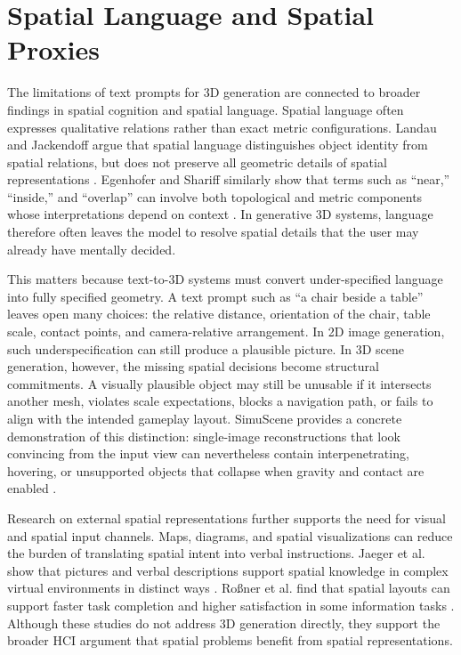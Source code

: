 \documentclass[11pt]{report}
\begin{document}
\section{Spatial Language and Spatial Proxies}
\label{sec:rw-spatial-language}

The limitations of text prompts for 3D generation are connected to broader findings in spatial cognition and spatial language. Spatial language often expresses qualitative relations rather than exact metric configurations. Landau and Jackendoff argue that spatial language distinguishes object identity from spatial relations, but does not preserve all geometric details of spatial representations \cite{landau1993what}. Egenhofer and Shariff similarly show that terms such as ``near,'' ``inside,'' and ``overlap'' can involve both topological and metric components whose interpretations depend on context \cite{egenhofer1998metric}. In generative 3D systems, language therefore often leaves the model to resolve spatial details that the user may already have mentally decided. 

This matters because text-to-3D systems must convert under-specified language into fully specified geometry. A text prompt such as ``a chair beside a table'' leaves open many choices: the relative distance, orientation of the chair, table scale, contact points, and camera-relative arrangement. In 2D image generation, such underspecification can still produce a plausible picture. In 3D scene generation, however, the missing spatial decisions become structural commitments. A visually plausible object may still be unusable if it intersects another mesh, violates scale expectations, blocks a navigation path, or fails to align with the intended gameplay layout. SimuScene provides a concrete demonstration of this distinction: single-image reconstructions that look convincing from the input view can nevertheless contain interpenetrating, hovering, or unsupported objects that collapse when gravity and contact are enabled \cite{lee2026simuscene}.

Research on external spatial representations further supports the need for visual and spatial input channels. Maps, diagrams, and spatial visualizations can reduce the burden of translating spatial intent into verbal instructions. Jaeger et al. show that pictures and verbal descriptions support spatial knowledge in complex virtual environments in distinct ways \cite{jaeger2023picture}. Roßner et al. find that spatial layouts can support faster task completion and higher satisfaction in some information tasks \cite{rossner2022spatial}. Although these studies do not address 3D generation directly, they support the broader HCI argument that spatial problems benefit from spatial representations.
\end{document}
